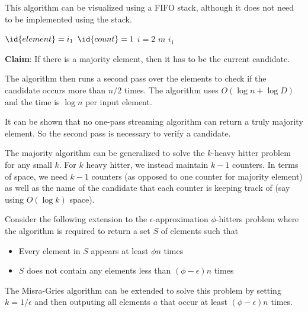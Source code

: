 This algorithm can be visualized using a FIFO stack, although it does not need to be implemented using the stack.

\begin{codebox}
    \li $\id{element} = i_1$
    \li $\id{count} = 1$
    \li \For $i = 2$ \To $m$ \Do
        \li \If $i_1$ 
\end{codebox}

\textbf{Claim}: If there is a majority element, then it has to be the current candidate.

The algorithm then runs a second pass over the elements to check if the candidate occurs more than $n / 2$ times. The algorithm uses $O(\log n + \log D)$ and the time is $\log n$ per input element.

It can be shown that no one-pass streaming algorithm can return a truly majority element. So the second pass is necessary to verify a candidate.

The majority algorithm can be generalized to solve the $k$-heavy hitter problem for any small $k$. For $k$ heavy hitter, we instead maintain $k - 1$ counters. In terms of space, we need $k-1$ counters (as opposed to one counter for majority element) as well as the name of the candidate that each counter is keeping track of (say using $O(\log k)$ space).

Consider the following extension to the $\epsilon$-approximation $\phi$-hitters problem where the algorithm is required to return a set $S$ of elements such that
\begin{itemize}
    \item Every element in $S$ appears at least $\phi n$ times
    \item $S$ does not contain any elements less than $(\phi - \epsilon)n$ times
\end{itemize}

The Misra-Gries algorithm can be extended to solve this problem by setting $k = 1 / \epsilon$ and then outputing all elements $a$ that occur at least $(\phi - \epsilon)n$ times.

